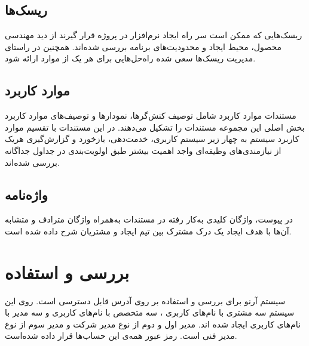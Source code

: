 \subsection{ریسک‌ها}
ریسک‌هایی که ممکن است سر راه ایجاد نرم‌افزار در پروژه قرار گیرند از دید مهندسی محصول، محیط ایجاد و محدودیت‌های برنامه بررسی شده‌اند. همچنین در راستای مدیریت ریسک‌ها سعی شده راه‌حل‌هایی برای هر یک از موارد ارائه شود.
\subsection{موارد کاربرد}
مستندات موارد کاربرد شامل توصیف کنش‌گرها، نمودارها و توصیف‌های موارد کاربرد بخش اصلی این مجموعه مستندات را تشکیل می‌دهند. در این مستندات با تقسیم موارد کاربرد سیستم به چهار زیر سیستم کاربری، خدمت‌دهی، بازخورد و گزارش‌گیری هریک از نیازمندی‌های وظیفه‌ای واجد اهمیت بیشتر طبق اولویت‌بندی در جداول جداگانه بررسی شده‌اند.
\subsection{واژه‌نامه}
در پیوست، واژگان کلیدی به‌کار رفته در مستندات به‌همراه واژگان مترادف و متشابه آن‌ها با هدف ایجاد یک درک مشترک بین تیم ایجاد و مشتریان شرح داده شده است.

\section{بررسی و استفاده}
سیستم آرنو برای بررسی و استفاده بر روی آدرس \href{http://arno.mostafaojaghi.ir}{} قابل دسترسی است.
روی این سیستم سه مشتری با نام‌های کاربری ، سه متخصص با نام‌های کاربری  و سه مدیر با نام‌های کاربری  ایجاد شده اند.
مدیر اول و دوم از نوع مدیر شرکت و مدیر سوم از نوع مدیر فنی است.
رمز عبور همه‌ی این حساب‌ها  قرار داده شده‌است.